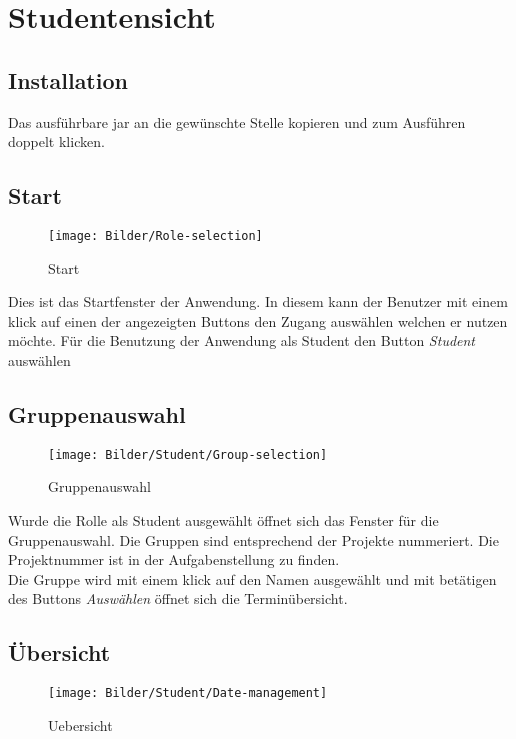 \section{Studentensicht}

\subsection{Installation}
Das ausführbare jar an die gewünschte Stelle kopieren und zum Ausführen doppelt klicken.

\subsection{Start}
\begin{figure}
\texttt{[image: Bilder/Role-selection]}
\label{Start}
\caption{Start}
\end{figure}
\FloatBarrier

Dies ist das Startfenster der Anwendung. In diesem kann der Benutzer mit einem klick auf einen der angezeigten Buttons den Zugang auswählen welchen er nutzen möchte. Für die Benutzung der Anwendung als Student den Button \textit{Student} auswählen


\subsection{Gruppenauswahl}
\begin{figure}
\texttt{[image: Bilder/Student/Group-selection]}
\label{Gruppenauswahl}
\caption{Gruppenauswahl}
\end{figure}
\FloatBarrier

Wurde die Rolle als Student ausgewählt öffnet sich das Fenster für die Gruppenauswahl. Die Gruppen sind entsprechend der Projekte nummeriert. Die Projektnummer ist in der Aufgabenstellung zu finden. 
\\
Die Gruppe wird mit einem klick auf den Namen ausgewählt und mit betätigen des Buttons \textit{Auswählen} öffnet sich die Terminübersicht.

\subsection{Übersicht}
\begin{figure}
\texttt{[image: Bilder/Student/Date-management]}
\label{Uebersicht}
\caption{Uebersicht}
\end{figure}
\FloatBarrier

